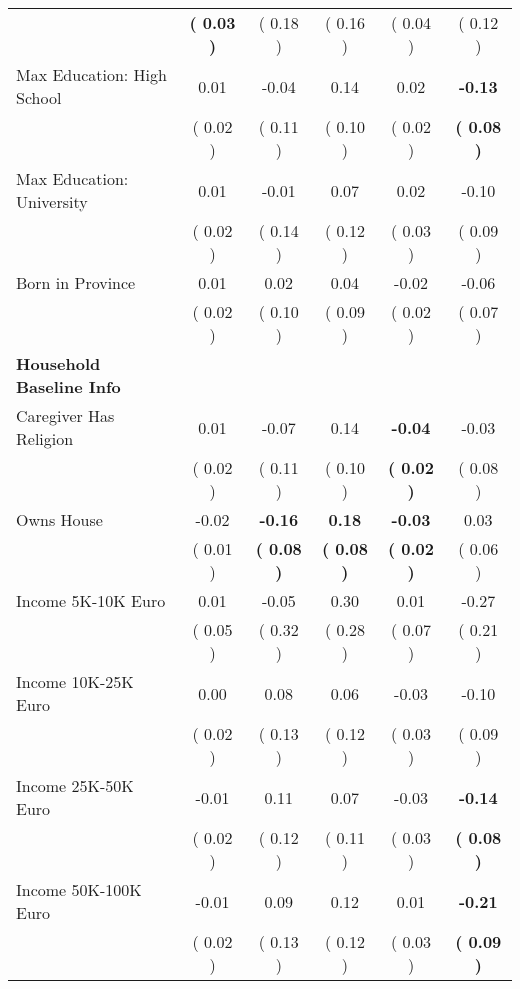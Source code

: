 \begin{table}[H]
{\begin{tabular}{lccccc}
\quad  & \textbf{(     0.03 )} & (     0.18 )  & (     0.16 )  & (     0.04 ) & (     0.12 ) \\
\quad Max Education: High School &      0.01 &     -0.04 &      0.14 &      0.02 & \textbf{    -0.13} \\
\quad  & (     0.02 ) & (     0.11 )  & (     0.10 )  & (     0.02 ) & \textbf{(     0.08 )} \\
\quad Max Education: University &      0.01 &     -0.01 &      0.07 &      0.02 &     -0.10 \\
\quad  & (     0.02 ) & (     0.14 )  & (     0.12 )  & (     0.03 ) & (     0.09 ) \\
\quad Born in Province &      0.01 &      0.02 &      0.04 &     -0.02 &     -0.06 \\
\quad  & (     0.02 ) & (     0.10 )  & (     0.09 )  & (     0.02 ) & (     0.07 ) \\
\midrule
\textbf{Household Baseline Info} \\
\quad Caregiver Has Religion &      0.01 &     -0.07 &      0.14 & \textbf{    -0.04} &     -0.03 \\
\quad  & (     0.02 ) & (     0.11 )  & (     0.10 )  & \textbf{(     0.02 )} & (     0.08 ) \\
\quad Owns House &     -0.02 & \textbf{    -0.16} & \textbf{     0.18} & \textbf{    -0.03} &      0.03 \\
\quad  & (     0.01 ) & \textbf{(     0.08 )}  & \textbf{(     0.08 )}  & \textbf{(     0.02 )} & (     0.06 ) \\
\quad Income 5K-10K Euro &      0.01 &     -0.05 &      0.30 &      0.01 &     -0.27 \\
\quad  & (     0.05 ) & (     0.32 )  & (     0.28 )  & (     0.07 ) & (     0.21 ) \\
\quad Income 10K-25K Euro &      0.00 &      0.08 &      0.06 &     -0.03 &     -0.10 \\
\quad  & (     0.02 ) & (     0.13 )  & (     0.12 )  & (     0.03 ) & (     0.09 ) \\
\quad Income 25K-50K Euro &     -0.01 &      0.11 &      0.07 &     -0.03 & \textbf{    -0.14} \\
\quad  & (     0.02 ) & (     0.12 )  & (     0.11 )  & (     0.03 ) & \textbf{(     0.08 )} \\
\quad Income 50K-100K Euro &     -0.01 &      0.09 &      0.12 &      0.01 & \textbf{    -0.21} \\
\quad  & (     0.02 ) & (     0.13 )  & (     0.12 )  & (     0.03 ) & \textbf{(     0.09 )} \\

\end{tabular}}
\end{table}
